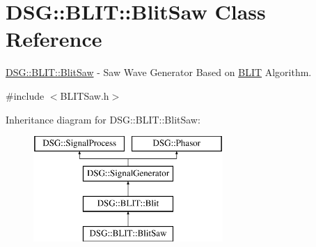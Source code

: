 \hypertarget{class_d_s_g_1_1_b_l_i_t_1_1_blit_saw}{\section{D\+S\+G\+:\+:B\+L\+I\+T\+:\+:Blit\+Saw Class Reference}
\label{class_d_s_g_1_1_b_l_i_t_1_1_blit_saw}
}


\hyperlink{class_d_s_g_1_1_b_l_i_t_1_1_blit_saw}{D\+S\+G\+::\+B\+L\+I\+T\+::\+Blit\+Saw} -\/ Saw Wave Generator Based on \hyperlink{namespace_d_s_g_1_1_b_l_i_t}{B\+L\+I\+T} Algorithm.  




{\ttfamily \#include $<$B\+L\+I\+T\+Saw.\+h$>$}

Inheritance diagram for D\+S\+G\+:\+:B\+L\+I\+T\+:\+:Blit\+Saw\+:\begin{figure}[H]
\begin{center}
\leavevmode
\includegraphics[height=4.000000cm]{class_d_s_g_1_1_b_l_i_t_1_1_blit_saw}
\end{center}
\end{figure}
